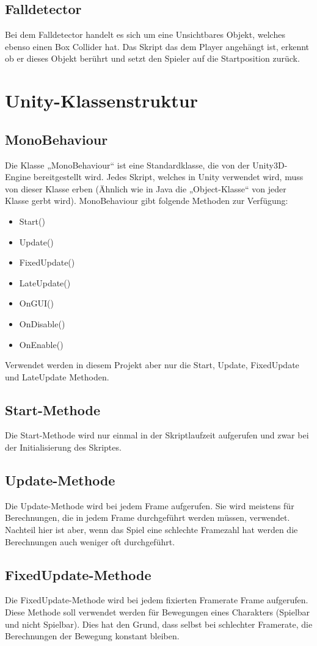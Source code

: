 \subsection{Falldetector}
Bei dem Falldetector handelt es sich um eine Unsichtbares Objekt, welches ebenso einen Box Collider hat. Das Skript das dem Player angehängt ist, erkennt ob er dieses Objekt berührt und setzt den Spieler auf die Startposition zurück.


\section{Unity-Klassenstruktur}
\subsection{MonoBehaviour}	
Die Klasse „MonoBehaviour“ ist eine Standardklasse, die von der Unity3D-Engine bereitgestellt wird. Jedes Skript, welches in Unity verwendet wird, muss von dieser Klasse erben (Ähnlich wie in Java die „Object-Klasse“ von jeder Klasse gerbt wird). MonoBehaviour gibt folgende Methoden zur Verfügung:
\begin{itemize}
	\item Start()
	\item Update()
	\item FixedUpdate()
	\item LateUpdate()
	\item OnGUI()
	\item OnDisable()
	\item OnEnable()
\end{itemize}
Verwendet werden in diesem Projekt aber nur die Start, Update, FixedUpdate und LateUpdate Methoden.
\subsection{Start-Methode}
Die Start-Methode wird nur einmal in der Skriptlaufzeit aufgerufen und zwar bei der Initialisierung des Skriptes.
\subsection{Update-Methode}
Die Update-Methode wird bei jedem Frame aufgerufen. Sie wird meistens für Berechnungen, die in jedem Frame durchgeführt werden müssen, verwendet. Nachteil hier ist aber, wenn das Spiel eine schlechte Framezahl hat werden die Berechnungen auch weniger oft durchgeführt.
\subsection{FixedUpdate-Methode}
Die FixedUpdate-Methode wird bei jedem fixierten Framerate Frame aufgerufen. Diese Methode soll verwendet werden für Bewegungen eines Charakters (Spielbar und nicht Spielbar). Dies hat den Grund, dass selbst bei schlechter Framerate, die Berechnungen der Bewegung konstant bleiben.
